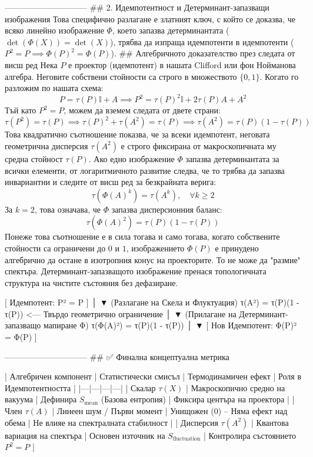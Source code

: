 ------------------------------
## 2. Идемпотентност и Детерминант-запазващи изображения
Това специфично разлагане е златният ключ, с който се доказва, че всяко линейно изображение $\Phi$, което запазва детерминантата ($\det(\Phi(X)) = \det(X)$), трябва да изпраща идемпотенти в идемпотенти ($P^2 = P \implies \Phi(P)^2 = \Phi(P)$).
## Алгебричното доказателство през следата от висш ред
Нека $P$ е проектор (идемпотент) в нашата Clifford или фон Нойманова алгебра. Неговите собствени стойности са строго в множеството $\{0, 1\}$. Когато го разложим по нашата схема:
$$P = \tau(P)\mathbb{I} + A \implies P^2 = \tau(P)^2 \mathbb{I} + 2\tau(P)A + A^2$$ 
Тъй като $P^2 = P$, можем да вземем следата от двете страни:
$$\tau(P^2) = \tau(P) \implies \tau(P)^2 + \tau(A^2) = \tau(P) \implies \tau(A^2) = \tau(P)(1 - \tau(P))$$ 
Това квадратично съотношение показва, че за всеки идемпотент, неговата геометрична дисперсия $\tau(A^2)$ е строго фиксирана от макроскопичната му средна стойност $\tau(P)$.
Ако едно изображение $\Phi$ запазва детерминантата за всички елементи, от логаритмичното развитие следва, че то трябва да запазва инвариантни и следите от висш ред за безкрайната верига:
$$\tau(\Phi(A)^k) = \tau(A^k), \quad \forall k \ge 2$$ 
За $k=2$, това означава, че $\Phi$ запазва дисперсионния баланс:
$$\tau(\Phi(A)^2) = \tau(P)(1 - \tau(P))$$ 
Понеже това съотношение е в сила тогава и само тогава, когато собствените стойности са ограничени до $0$ и $1$, изображението $\Phi(P)$ е принудено алгебрично да остане в изотропния конус на проекторите. То не може да "размие" спектъра. Детерминант-запазващото изображение пренася топологичната структура на чистите състояния без дефазиране.

          [ Идемпотент: P² = P ]
                     │
                     ▼ (Разлагане на Скела и Флуктуация)
       τ(A²) = τ(P)(1 - τ(P))  <--- Твърдо геометрично ограничение
                     │
                     ▼ (Прилагане на Детерминант-запазващо мапиране Φ)
       τ(Φ(A)²) = τ(P)(1 - τ(P))
                     │
                     ▼
         [ Нов Идемпотент: Φ(P)² = Φ(P) ]

------------------------------
## ✅ Финална концептуална метрика

| Алгебричен компонент | Статистически смисъл | Термодинамичен ефект | Роля в Идемпотентността |
|---|---|---|---|
| Скалар $\tau(X)$ | Макроскопично средно на вакуума | Дефинира $S_{\text{mean}}$ (Базова ентропия) | Фиксира центъра на проектора |
| Член $\tau(A)$ | Линеен шум / Първи момент | Унищожен ($0$) – Няма ефект над обема | Не влияе на спектралната стабилност |
| Дисперсия $\tau(A^2)$ | Квантова вариация на спектъра | Основен източник на $S_{\text{fluctuation}}$ | Контролира състоянието $P^2=P$ |

